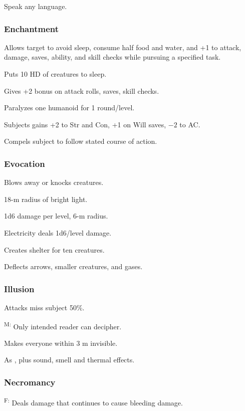 	 Speak any language.

\subsubsection{Enchantment}
	 Allows target to avoid sleep, consume half food and water, and +1 to attack, damage, saves, ability, and skill checks while pursuing a specified task. %

	 Puts 10 HD of creatures to sleep.

	 Gives +2 bonus on attack rolls, saves, skill checks.

	 Paralyzes one humanoid for 1 round/level.

	 Subjects gains +2 to Str and Con, +1 on Will saves, $-2$ to AC.

	 Compels subject to follow stated course of action.

\subsubsection{Evocation}
	 Blows away or knocks creatures.

	 18-m radius of bright light.

	 1d6 damage per level, 6-m radius.

	 Electricity deals 1d6/level damage.

	 Creates shelter for ten creatures.

	 Deflects arrows, smaller creatures, and gases.

\subsubsection{Illusion}
	 Attacks miss subject 50\%.

	\textsuperscript{M:} Only intended reader can decipher.

	 Makes everyone within 3 m invisible.

	 As , plus sound, smell and thermal effects.

\subsubsection{Necromancy}
	\textsuperscript{F:} Deals damage that continues to cause bleeding damage. %

